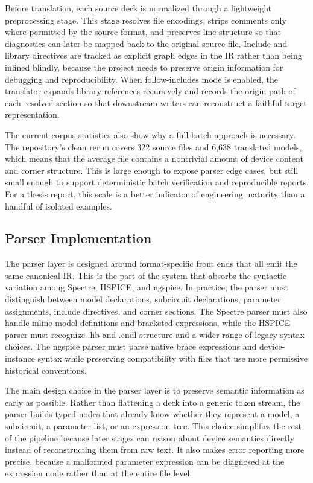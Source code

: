 \documentclass[10pt,twocolumn]{article}
\begin{document}
Before translation, each source deck is normalized through a lightweight preprocessing stage. This stage resolves file encodings, strips comments only where permitted by the source format, and preserves line structure so that diagnostics can later be mapped back to the original source file. Include and library directives are tracked as explicit graph edges in the IR rather than being inlined blindly, because the project needs to preserve origin information for debugging and reproducibility. When follow-includes mode is enabled, the translator expands library references recursively and records the origin path of each resolved section so that downstream writers can reconstruct a faithful target representation.

The current corpus statistics also show why a full-batch approach is necessary. The repository's clean rerun covers 322 source files and 6,638 translated models, which means that the average file contains a nontrivial amount of device content and corner structure. This is large enough to expose parser edge cases, but still small enough to support deterministic batch verification and reproducible reports. For a thesis report, this scale is a better indicator of engineering maturity than a handful of isolated examples.

\subsection{Parser Implementation}

The parser layer is designed around format-specific front ends that all emit the same canonical IR. This is the part of the system that absorbs the syntactic variation among Spectre, HSPICE, and ngspice. In practice, the parser must distinguish between model declarations, subcircuit declarations, parameter assignments, include directives, and corner sections. The Spectre parser must also handle inline model definitions and bracketed expressions, while the HSPICE parser must recognize .lib and .endl structure and a wider range of legacy syntax choices. The ngspice parser must parse native brace expressions and device-instance syntax while preserving compatibility with files that use more permissive historical conventions.

The main design choice in the parser layer is to preserve semantic information as early as possible. Rather than flattening a deck into a generic token stream, the parser builds typed nodes that already know whether they represent a model, a subcircuit, a parameter list, or an expression tree. This choice simplifies the rest of the pipeline because later stages can reason about device semantics directly instead of reconstructing them from raw text. It also makes error reporting more precise, because a malformed parameter expression can be diagnosed at the expression node rather than at the entire file level.
\end{document}
